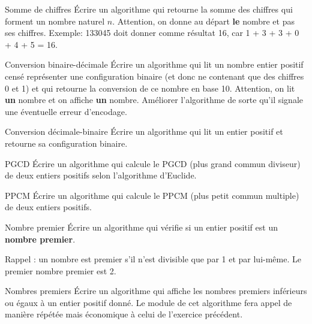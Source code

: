 \begin{Exercice}{Somme de chiffres}
	Écrire un algorithme qui retourne la somme des chiffres qui forment un
	nombre naturel $n$. Attention, on donne au départ \textbf{le} nombre et
	pas ses chiffres. Exemple: 133045 doit donner comme résultat 16,
	car 1 + 3 + 3 + 0 + 4 + 5 = 16.
\end{Exercice}

\begin{Exercice}{Conversion binaire-décimale}
	Écrire un algorithme qui lit un nombre entier positif censé représenter
	une configuration binaire (et donc ne contenant que des chiffres 0 et
	1) et qui retourne la conversion de ce nombre en base 10. Attention, on
	lit \textbf{un} nombre et on affiche \textbf{un} nombre. Améliorer
	l’algorithme de sorte qu’il signale une éventuelle erreur d’encodage.
\end{Exercice}

\begin{Exercice}{Conversion décimale-binaire}
	Écrire un algorithme qui lit un entier positif et retourne sa
	configuration binaire.
\end{Exercice}

\begin{Exercice}{PGCD}
	Écrire un algorithme qui calcule le PGCD (plus grand commun diviseur) de
	deux entiers positifs selon l’algorithme d’Euclide.
\end{Exercice}

\begin{Exercice}{PPCM}
	Écrire un algorithme qui calcule le PPCM (plus petit commun multiple) de
	deux entiers positifs.
\end{Exercice}

\begin{Exercice}{Nombre premier}
	Écrire un algorithme qui vérifie si un entier positif est un
	\textbf{nombre premier}. 
	
	Rappel : un nombre est premier s’il n’est divisible que par 1 et par
	lui-même. Le premier nombre premier est 2.
\end{Exercice}

\bigskip
\begin{Exercice}{Nombres premiers}
	Écrire un algorithme qui affiche les nombres premiers inférieurs ou
	égaux à un entier positif donné. Le module de cet algorithme fera appel
	de manière répétée mais économique à celui de l’exercice précédent.
\end{Exercice}

